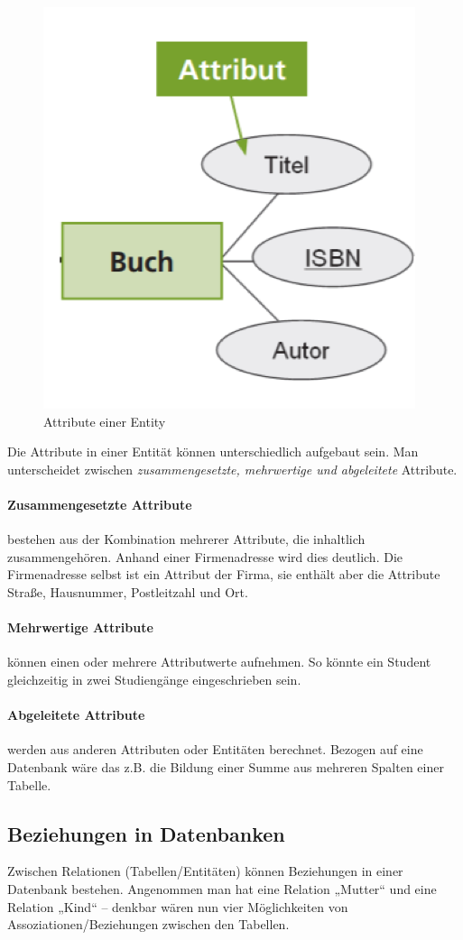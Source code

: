 \begin{figure}[H]
    \centering
    \includegraphics[width=.4\textwidth]{Content/images/modellierung/entity.png}
    \caption{Attribute einer Entity}
    \label{fig:modellierung:entity}
 \end{figure}

 Die Attribute in einer Entität können unterschiedlich aufgebaut sein. Man unterscheidet zwischen \emph{zusammengesetzte, mehrwertige und abgeleitete} Attribute.

 \paragraph{Zusammengesetzte Attribute} bestehen aus der Kombination mehrerer Attribute, die inhaltlich zusammengehören. Anhand einer Firmenadresse wird dies deutlich. Die Firmenadresse selbst ist ein Attribut der Firma, sie enthält aber die Attribute Straße, Hausnummer, Postleitzahl und Ort.

 \paragraph{Mehrwertige Attribute} können einen oder mehrere Attributwerte aufnehmen. So könnte ein Student gleichzeitig in zwei Studiengänge eingeschrieben sein.

 \paragraph{Abgeleitete Attribute} werden aus anderen Attributen oder Entitäten berechnet. Bezogen auf eine Datenbank wäre das z.B. die Bildung einer Summe aus mehreren Spalten einer Tabelle.

 \subsection{Beziehungen in Datenbanken}

 Zwischen Relationen (Tabellen/Entitäten) können Beziehungen in einer Datenbank bestehen. Angenommen man hat eine Relation „Mutter“ und eine Relation „Kind“ – denkbar wären nun vier Möglichkeiten von Assoziationen/Beziehungen zwischen den Tabellen.

